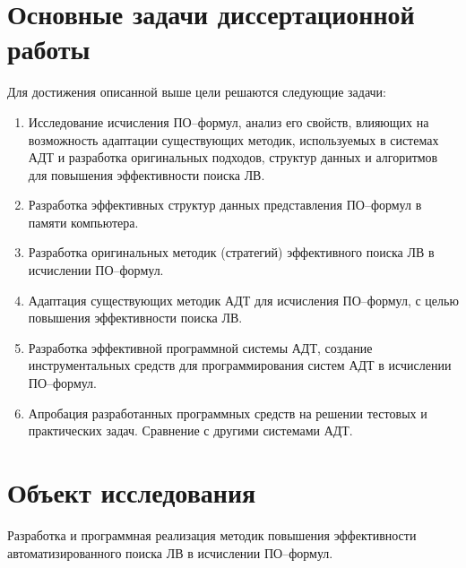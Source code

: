 \section*{Основные задачи диссертационной работы}
Для достижения описанной выше цели решаются следующие задачи:
\begin{enumerate}
\item Исследование исчисления ПО--формул, анализ его свойств, влияющих на возможность адаптации существующих методик, используемых в системах АДТ и разработка оригинальных подходов, структур данных и алгоритмов для повышения эффективности поиска ЛВ.
\item Разработка эффективных структур данных представления ПО--формул в памяти компьютера.
\item Разработка оригинальных методик (стратегий) эффективного поиска ЛВ в исчислении ПО--формул.
\item Адаптация существующих методик АДТ для исчисления ПО--формул, с целью повышения эффективности поиска ЛВ.
\item Разработка эффективной программной системы АДТ, создание инструментальных средств для программирования систем АДТ в исчислении ПО--формул.
\item Апробация разработанных программных средств на решении тестовых и практических задач. Сравнение с другими системами АДТ.
\end{enumerate}


\section*{Объект исследования}
Разработка и программная реализация методик повышения эффективности автоматизированного поиска ЛВ в исчислении ПО--формул.


